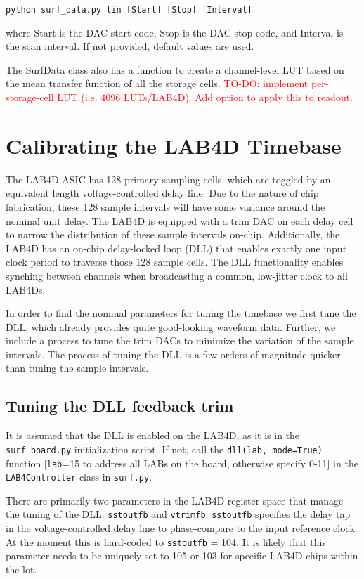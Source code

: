 \documentclass[11pt]{article}
\begin{document}
\verb!python surf_data.py lin [Start] [Stop] [Interval]!

\smallskip
where Start is the DAC start code, Stop is the DAC stop code, and Interval is the scan interval.
If not provided, default values are used.

The SurfData class also has a function to create a channel-level LUT
based on the mean transfer function of all the storage cells. \textcolor{red}{TO-DO: implement per-storage-cell LUT (i.e. 4096 LUTs/LAB4D). Add option to apply this to readout.} 

\section{Calibrating the LAB4D Timebase}

The LAB4D ASIC has 128 primary sampling cells, which are toggled by an equivalent length voltage-controlled delay line. Due to the nature
of chip fabrication, these 128 sample intervals will have some variance around the nominal unit delay. The LAB4D is equipped with a trim DAC
on each delay cell to narrow the distribution of these sample intervals on-chip.
Additionally, the LAB4D has an on-chip delay-locked loop (DLL) that enables exactly one input clock period to traverse those 128 sample cells.
The DLL functionality enables synching between channels when broadcasting a common, low-jitter clock to all LAB4Ds.

In order to find the nominal parameters for tuning the timebase we first tune the DLL, which already provides quite good-looking waveform data. Further, we include
a process to tune the trim DACs to minimize the variation of the sample intervals. The process of tuning the DLL is a few orders of magnitude quicker than
tuning the sample intervals.

\subsection{Tuning the DLL feedback trim}

It is assumed that the DLL is enabled on the LAB4D, as it is in the \verb!surf_board.py! initialization script.
If not, call the \verb!dll(lab, mode=True)! function [\verb!lab!=15 to address all LABs on the board, otherwise specify 0-11] in the \verb!LAB4Controller! class in \verb!surf.py!.

There are primarily two parameters in the LAB4D register space that manage the tuning of the DLL: \verb!sstoutfb! and \verb!vtrimfb!.
\verb!sstoutfb! specifies the delay tap in the voltage-controlled delay line to phase-compare to the input reference clock. At the moment this is hard-coded
to \verb!sstoutfb! = 104. It is likely that this parameter needs to be uniquely set to 105 or 103 for specific LAB4D chips within the lot.
\end{document}
